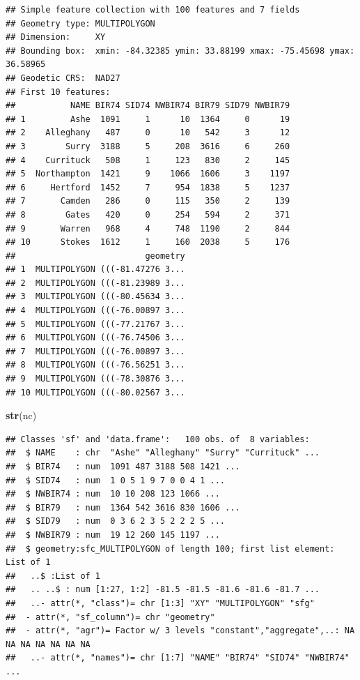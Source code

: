 \documentclass[
]{book}
\newenvironment{Shaded}{\begin{snugshade}}{\end{snugshade}}
\newcommand{\FunctionTok}[1]{\textcolor[rgb]{0.13,0.29,0.53}{\textbf{#1}}}
\newcommand{\NormalTok}[1]{#1}
\theoremstyle{break}
\theoremstyle{definition}
\theoremstyle{definition}
\theoremstyle{definition}
\theoremstyle{definition}
\theoremstyle{remark}
\begin{document}
\begin{verbatim}
## Simple feature collection with 100 features and 7 fields
## Geometry type: MULTIPOLYGON
## Dimension:     XY
## Bounding box:  xmin: -84.32385 ymin: 33.88199 xmax: -75.45698 ymax: 36.58965
## Geodetic CRS:  NAD27
## First 10 features:
##           NAME BIR74 SID74 NWBIR74 BIR79 SID79 NWBIR79
## 1         Ashe  1091     1      10  1364     0      19
## 2    Alleghany   487     0      10   542     3      12
## 3        Surry  3188     5     208  3616     6     260
## 4    Currituck   508     1     123   830     2     145
## 5  Northampton  1421     9    1066  1606     3    1197
## 6     Hertford  1452     7     954  1838     5    1237
## 7       Camden   286     0     115   350     2     139
## 8        Gates   420     0     254   594     2     371
## 9       Warren   968     4     748  1190     2     844
## 10      Stokes  1612     1     160  2038     5     176
##                          geometry
## 1  MULTIPOLYGON (((-81.47276 3...
## 2  MULTIPOLYGON (((-81.23989 3...
## 3  MULTIPOLYGON (((-80.45634 3...
## 4  MULTIPOLYGON (((-76.00897 3...
## 5  MULTIPOLYGON (((-77.21767 3...
## 6  MULTIPOLYGON (((-76.74506 3...
## 7  MULTIPOLYGON (((-76.00897 3...
## 8  MULTIPOLYGON (((-76.56251 3...
## 9  MULTIPOLYGON (((-78.30876 3...
## 10 MULTIPOLYGON (((-80.02567 3...
\end{verbatim}

\begin{Shaded}
\begin{Highlighting}[]
\FunctionTok{str}\NormalTok{(nc)}
\end{Highlighting}
\end{Shaded}

\begin{verbatim}
## Classes 'sf' and 'data.frame':   100 obs. of  8 variables:
##  $ NAME    : chr  "Ashe" "Alleghany" "Surry" "Currituck" ...
##  $ BIR74   : num  1091 487 3188 508 1421 ...
##  $ SID74   : num  1 0 5 1 9 7 0 0 4 1 ...
##  $ NWBIR74 : num  10 10 208 123 1066 ...
##  $ BIR79   : num  1364 542 3616 830 1606 ...
##  $ SID79   : num  0 3 6 2 3 5 2 2 2 5 ...
##  $ NWBIR79 : num  19 12 260 145 1197 ...
##  $ geometry:sfc_MULTIPOLYGON of length 100; first list element: List of 1
##   ..$ :List of 1
##   .. ..$ : num [1:27, 1:2] -81.5 -81.5 -81.6 -81.6 -81.7 ...
##   ..- attr(*, "class")= chr [1:3] "XY" "MULTIPOLYGON" "sfg"
##  - attr(*, "sf_column")= chr "geometry"
##  - attr(*, "agr")= Factor w/ 3 levels "constant","aggregate",..: NA NA NA NA NA NA NA
##   ..- attr(*, "names")= chr [1:7] "NAME" "BIR74" "SID74" "NWBIR74" ...
\end{verbatim}
\end{document}
